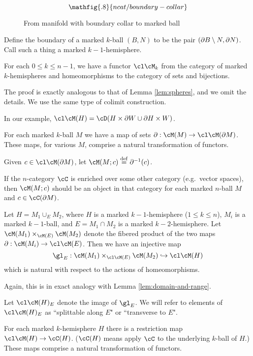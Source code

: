 \begin{figure}[!ht]
$$\mathfig{.8}{ncat/boundary-collar}$$
\caption{From manifold with boundary collar to marked ball}\label{blah15}\end{figure}

Define the boundary of a marked $k$-ball $(B, N)$ to be the pair $(\partial B \setminus N, \partial N)$.
Call such a thing a {marked $k{-}1$-hemisphere}.

\begin{lem}
\label{lem:hemispheres}
{For each $0 \le k \le n-1$, we have a functor $\cl\cM_k$ from 
the category of marked $k$-hemispheres and 
homeomorphisms to the category of sets and bijections.}
\end{lem}
The proof is exactly analogous to that of Lemma \ref{lem:spheres}, and we omit the details.
We use the same type of colimit construction.

In our example, $\cl\cM(H) = \cD(H\times\bd W \cup \bd H\times W)$.

\begin{module-axiom}
{For each marked $k$-ball $M$ we have a map of sets $\bd: \cM(M)\to \cl\cM(\bd M)$.
These maps, for various $M$, comprise a natural transformation of functors.}
\end{module-axiom}

Given $c\in\cl\cM(\bd M)$, let $\cM(M; c) \deq \bd^{-1}(c)$.

If the $n$-category $\cC$ is enriched over some other category (e.g.\ vector spaces),
then $\cM(M; c)$ should be an object in that category for each marked $n$-ball $M$
and $c\in \cC(\bd M)$.

\begin{lem}
{Let $H = M_1 \cup_E M_2$, where $H$ is a marked $k{-}1$-hemisphere ($1\le k\le n$),
$M_i$ is a marked $k{-}1$-ball, and $E = M_1\cap M_2$ is a marked $k{-}2$-hemisphere.
Let $\cM(M_1) \times_{\cM(E)} \cM(M_2)$ denote the fibered product of the 
two maps $\bd: \cM(M_i)\to \cl\cM(E)$.
Then we have an injective map
\[
	\gl_E : \cM(M_1) \times_{\cl\cM(E)} \cM(M_2) \hookrightarrow \cl\cM(H)
\]
which is natural with respect to the actions of homeomorphisms.}
\end{lem}
Again, this is in exact analogy with Lemma \ref{lem:domain-and-range}.

Let $\cl\cM(H)_E$ denote the image of $\gl_E$.
We will refer to elements of $\cl\cM(H)_E$ as ``splittable along $E$" or ``transverse to $E$". 

\begin{lem}
{For each marked $k$-hemisphere $H$ there is a restriction map
$\cl\cM(H)\to \cC(H)$.  
($\cC(H)$ means apply $\cC$ to the underlying $k$-ball of $H$.)
These maps comprise a natural transformation of functors.}
\end{lem}

